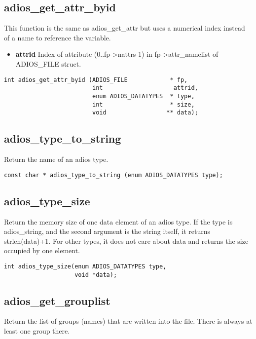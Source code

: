 \subsection{adios\_get\_attr\_byid}
This function is the same as adios\_get\_attr but uses a numerical index instead of a name to reference the variable. 
\begin{itemize}
\item{\bf attrid} Index of attribute (0..fp->nattrs-1) in fp->attr\_namelist of ADIOS\_FILE struct. 
\end{itemize}
\begin{lstlisting}[alsolanguage=C]
int adios_get_attr_byid (ADIOS_FILE            * fp, 
                         int                    attrid,  
                         enum ADIOS_DATATYPES  * type,
                         int                   * size, 
                         void                 ** data);
\end{lstlisting}



\subsection{adios\_type\_to\_string}
 Return the name of an adios type. 

\begin{lstlisting}[alsolanguage=C]
const char * adios_type_to_string (enum ADIOS_DATATYPES type);
\end{lstlisting}


\subsection{adios\_type\_size}
Return the memory size of one data element of an adios type.
If the type is adios\_string, and the second argument is
the string itself, it returns strlen(data)+1. 
For other types, it does not care about data and returns
the size occupied by one element.

\begin{lstlisting}[alsolanguage=C]
int adios_type_size(enum ADIOS_DATATYPES type, 
                    void *data);
\end{lstlisting}


\subsection{adios\_get\_grouplist}
Return the list of groups (names) that are written into
the file. There is always at least one group there.


